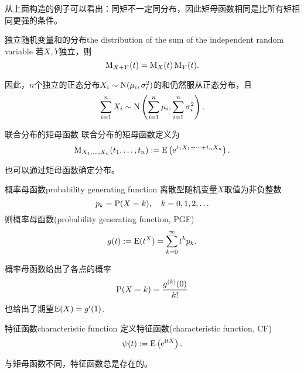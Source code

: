 从上面构造的例子可以看出：同矩不一定同分布，因此矩母函数相同是比所有矩相同更强的条件。
\begin{theorem}{独立随机变量和的分布}{the distribution of the sum of the independent random variable}
	若$X,Y$独立，则
	\[
		\MGF_{X+Y}(t)=\MGF_X(t)\MGF_Y(t).
	\]
\end{theorem}
因此，$n$个独立的正态分布$X_i\sim\Norm(\mu_i,\sigma_i^2)$的和仍然服从正态分布，且
\[
	\sum_{i=1}^nX_i\sim\Norm\kh{\sum_{i=1}^n\mu_i,\sum_{i=1}^n\sigma_i^2}.
\]
\begin{definition}{联合分布的矩母函数}{}
	联合分布的矩母函数定义为
	\begin{align}
		\MGF_{X_1,\ldots,X_n}(t_1,\ldots,t_n):=\E\kh{\e{t_1X_1+\cdots+t_nX_n}}.
	\end{align}
\end{definition}
也可以通过矩母函数确定分布。
\begin{definition}{概率母函数}{probability generating function}
	离散型随机变量$X$取值为非负整数
	\[
		p_k=\P(X=k),\quad k=0,1,2,\ldots
	\]
	则概率母函数(probability generating function, PGF)
	\[
		g(t):=\E(t^X)=\sum_{k=0}^\infty t^kp_k.
	\]
\end{definition}
概率母函数给出了各点的概率
\[
	\P(X=k)=\frac{g^{(k)}(0)}{k!}
\]
也给出了期望$\E(X)=g'(1)$.
\begin{definition}{特征函数}{characteristic function}
	定义特征函数(characteristic function, CF)
	\begin{align}\label{CF-def}
		\psi(t):=\E\kh{\e{\i tX}}.
	\end{align}
\end{definition}
与矩母函数不同，特征函数总是存在的。
